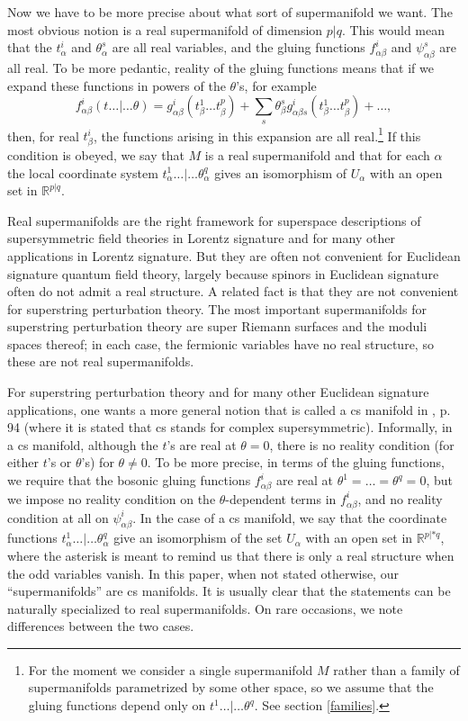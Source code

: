 \documentclass[11pt,a4paper]{article}
\def\R{{\mathbb R}}
\begin{document}
Now we have to be more precise about what sort of supermanifold we want.  The most obvious notion is a real supermanifold of dimension $p|q$.
This would mean that the $t^i_\alpha$ and $\theta^s_\alpha$ are all real variables, and the gluing functions $f^i_{\alpha\beta}$ and $\psi^s_{\alpha\beta}$ are
all real.  To be more pedantic, reality of the gluing functions means that if we expand these functions in powers of the $\theta$'s, for example
\begin{equation}\label{expo}f^i_{\alpha\beta}(t\dots|\dots\theta)=g^i_{\alpha\beta}(t^1_\beta\dots t^p_\beta)+\sum_s\theta^s_\beta g^i_{\alpha\beta s}(t^1_\beta\dots t^p_\beta)+\dots ,\end{equation}
then, for real $t^i_\beta$, the functions arising in this expansion are all real.\footnote{\label{dolf}For the moment we consider a single supermanifold $M$ rather than a family of supermanifolds
parametrized by some other space, so we assume that the gluing functions depend only on $t^1\dots|\dots\theta^q$.  See section
\ref{families}.}  
If this condition is obeyed, we say that $M$ is a real supermanifold and that for each $\alpha$ the
local coordinate system $t^1_\alpha\dots|\dots\theta^q_\alpha$ gives an isomorphism of  $U_\alpha$ with an open set in $\R^{p|q}$.

Real supermanifolds are  the right framework for superspace descriptions of supersymmetric field theories in Lorentz signature and for many
other applications in Lorentz signature. But
they are often not convenient for Euclidean signature quantum field theory, largely because spinors in Euclidean signature often do not admit a real structure. A  related fact is that they are not 
 convenient for superstring perturbation theory.  
 The most important supermanifolds for superstring perturbation theory are super Riemann surfaces and the moduli spaces thereof;  in each case, the fermionic variables have
no real structure, so these are not real supermanifolds.

 For superstring perturbation theory and for many other Euclidean signature applications, one wants a more general notion that is called a cs manifold  in \cite{DEF},
p. 94 (where it is stated that cs stands for complex supersymmetric).  
Informally, in  a cs manifold, although the $t$'s are real at $\theta=0$, there is no reality condition (for either $t$'s or $\theta$'s) for $\theta\not=0$.  
To be more precise, in terms of the gluing functions, we require that the bosonic gluing
functions $f^i_{\alpha\beta}$ are real at $\theta^1=\dots=\theta^q=0$, but we impose no reality condition on the $\theta$-dependent terms in $f^i_{\alpha\beta}$, and no
reality condition at all on $\psi^i_{\alpha\beta}$.
   In the case of a cs manifold, we say that the coordinate functions $t^1_\alpha\dots|\dots\theta^q_\alpha$
give an isomorphism of the set $U_\alpha$ with an open set in $\R^{p|*q}$, where the asterisk is meant to remind us that  there is only
a real structure when the odd variables vanish.    In this
paper, when not stated otherwise, our ``supermanifolds'' are  cs manifolds.  It is usually clear that the statements can be naturally specialized to real supermanifolds.
On rare occasions, we note differences between the two cases. 
\end{document}
